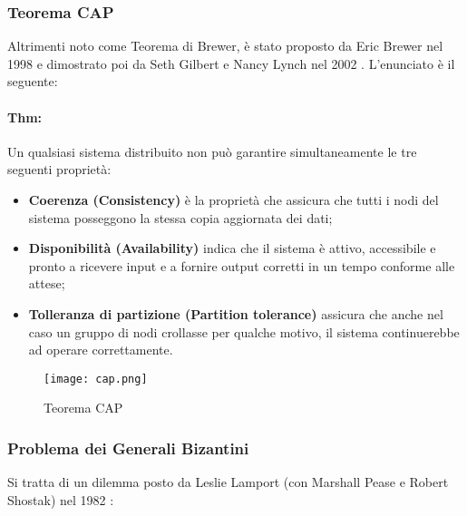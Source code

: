 		\subsubsection{Teorema CAP}\label{sec:teorema_CAP}
			Altrimenti noto come Teorema di Brewer, è stato proposto da Eric Brewer nel 1998 e dimostrato poi da Seth Gilbert e Nancy Lynch nel 2002 \cite{CAP}. L'enunciato è il seguente:
			\paragraph{Thm:} Un qualsiasi sistema distribuito non può garantire simultaneamente le tre seguenti proprietà:
			\begin{itemize}
				\item \textbf{Coerenza (Consistency)} è la proprietà che assicura che tutti i nodi del sistema posseggono la stessa copia aggiornata dei dati;
				\item \textbf{Disponibilità (Availability)} indica che il sistema è attivo, accessibile e pronto a ricevere input e a fornire output corretti in un tempo conforme alle attese;
				\item \textbf{Tolleranza di partizione (Partition tolerance)} assicura che anche nel caso un gruppo di nodi crollasse per qualche motivo, il sistema continuerebbe ad operare correttamente.
			\end{itemize}
			\begin{figure}[ht]
				\centering
				\texttt{[image: cap.png]}
				\caption[Teorema CAP]{Teorema CAP \cite{cap_diagram}}
				\label{fig:cap}
			\end{figure}

		\subsubsection{Problema dei Generali Bizantini}
			Si tratta di un dilemma posto da Leslie Lamport (con Marshall Pease e Robert Shostak) nel 1982 \cite{BGP}: 
